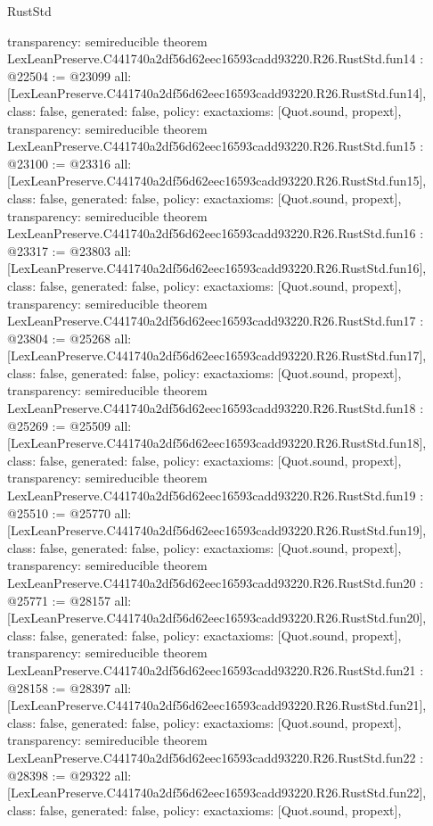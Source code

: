 \begin{lexlean}{RustStd}
\begin{coremodule}
{  transparency: semireducible
}
theorem LexLeanPreserve.C441740a2df56d62eec16593cadd93220.R26.RustStd.fun14 : @22504 := @23099 {
  all: [LexLeanPreserve.C441740a2df56d62eec16593cadd93220.R26.RustStd.fun14],
  class: false,
  generated: false,
  policy: exact{axioms: [Quot.sound, propext]},
  transparency: semireducible
}
theorem LexLeanPreserve.C441740a2df56d62eec16593cadd93220.R26.RustStd.fun15 : @23100 := @23316 {
  all: [LexLeanPreserve.C441740a2df56d62eec16593cadd93220.R26.RustStd.fun15],
  class: false,
  generated: false,
  policy: exact{axioms: [Quot.sound, propext]},
  transparency: semireducible
}
theorem LexLeanPreserve.C441740a2df56d62eec16593cadd93220.R26.RustStd.fun16 : @23317 := @23803 {
  all: [LexLeanPreserve.C441740a2df56d62eec16593cadd93220.R26.RustStd.fun16],
  class: false,
  generated: false,
  policy: exact{axioms: [Quot.sound, propext]},
  transparency: semireducible
}
theorem LexLeanPreserve.C441740a2df56d62eec16593cadd93220.R26.RustStd.fun17 : @23804 := @25268 {
  all: [LexLeanPreserve.C441740a2df56d62eec16593cadd93220.R26.RustStd.fun17],
  class: false,
  generated: false,
  policy: exact{axioms: [Quot.sound, propext]},
  transparency: semireducible
}
theorem LexLeanPreserve.C441740a2df56d62eec16593cadd93220.R26.RustStd.fun18 : @25269 := @25509 {
  all: [LexLeanPreserve.C441740a2df56d62eec16593cadd93220.R26.RustStd.fun18],
  class: false,
  generated: false,
  policy: exact{axioms: [Quot.sound, propext]},
  transparency: semireducible
}
theorem LexLeanPreserve.C441740a2df56d62eec16593cadd93220.R26.RustStd.fun19 : @25510 := @25770 {
  all: [LexLeanPreserve.C441740a2df56d62eec16593cadd93220.R26.RustStd.fun19],
  class: false,
  generated: false,
  policy: exact{axioms: [Quot.sound, propext]},
  transparency: semireducible
}
theorem LexLeanPreserve.C441740a2df56d62eec16593cadd93220.R26.RustStd.fun20 : @25771 := @28157 {
  all: [LexLeanPreserve.C441740a2df56d62eec16593cadd93220.R26.RustStd.fun20],
  class: false,
  generated: false,
  policy: exact{axioms: [Quot.sound, propext]},
  transparency: semireducible
}
theorem LexLeanPreserve.C441740a2df56d62eec16593cadd93220.R26.RustStd.fun21 : @28158 := @28397 {
  all: [LexLeanPreserve.C441740a2df56d62eec16593cadd93220.R26.RustStd.fun21],
  class: false,
  generated: false,
  policy: exact{axioms: [Quot.sound, propext]},
  transparency: semireducible
}
theorem LexLeanPreserve.C441740a2df56d62eec16593cadd93220.R26.RustStd.fun22 : @28398 := @29322 {
  all: [LexLeanPreserve.C441740a2df56d62eec16593cadd93220.R26.RustStd.fun22],
  class: false,
  generated: false,
  policy: exact{axioms: [Quot.sound, propext]},
}
\end{coremodule}
\end{lexlean}
